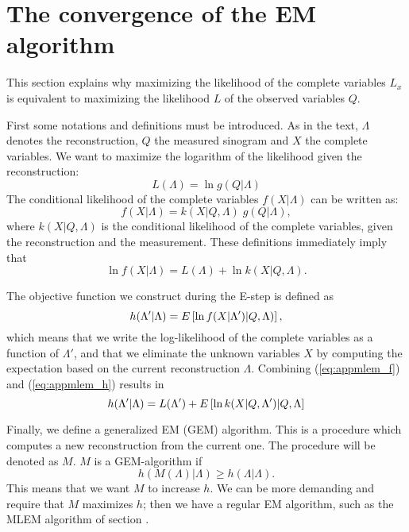 \newpage
\section{The convergence of the EM algorithm \label{app:em}}
This section explains why maximizing the likelihood of the complete variables
$L_x$ is equivalent to maximizing the likelihood $L$ of the observed variables
$Q$.

First some notations and definitions must be introduced. As in the text,
$\Lambda$ denotes the reconstruction, $Q$ the measured sinogram and $X$ the
complete variables. We want to maximize the logarithm of the likelihood
given the reconstruction:
\begin{equation}
  L(\Lambda) = \ln g(Q | \Lambda)
\end{equation}
The conditional likelihood of the complete variables $f(X | \Lambda)$  can be
written as:
\begin{equation}
  f(X | \Lambda) = k(X | Q, \Lambda) \; g(Q | \Lambda),
\end{equation}
where $k(X | Q, \Lambda)$ is the conditional likelihood of the complete
variables, given the reconstruction and the measurement. These definitions
immediately  imply that
\begin{equation}
  \ln f(X | \Lambda) = L(\Lambda) + \ln k(X | Q, \Lambda). \label{eq:appmlem_f}
\end{equation}

The objective function we construct during the E-step is defined as
\begin{equation}
  h(\Lambda' | \Lambda) = E\left[{\ln f(X | \Lambda') | Q, \Lambda)}\right],
      \label{eq:appmlem_h}
\end{equation}
which means that we write the log-likelihood of the complete variables as a
function of $\Lambda'$, and that we eliminate the unknown variables $X$ by
computing the expectation based on the current reconstruction $\Lambda$.
Combining (\ref{eq:appmlem_f}) and (\ref{eq:appmlem_h}) results in
\begin{equation}
  h(\Lambda' | \Lambda) = L(\Lambda') + E\left[{\ln k(X | Q, \Lambda') | Q,\Lambda}\right]
   \label{eq:appmlem_h2}
\end{equation}

Finally, we define a generalized EM (GEM) algorithm. This is a procedure which
computes a new reconstruction from the current one. The procedure will be
denoted as $M$. $M$ is a GEM-algorithm if
\begin{equation}
  h(M(\Lambda) | \Lambda) \geq h(\Lambda | \Lambda).
\end{equation}
This means that we want $M$ to increase $h$. We can be more demanding and
require that $M$ maximizes $h$; then we have a regular EM algorithm, such as
the MLEM algorithm of section .

